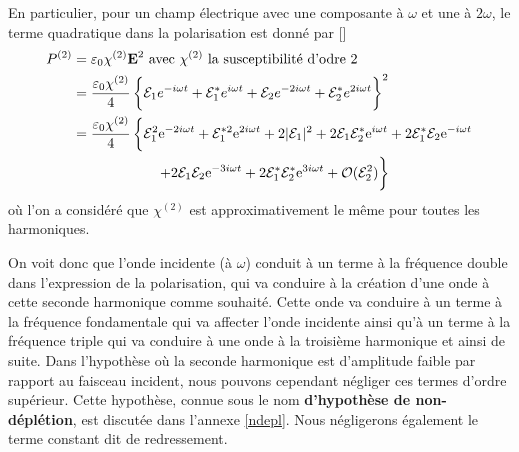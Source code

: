 \documentclass[11pt,a4paper]{article}
\newcommand{\ncite}[1]{[\citenum{#1}]}
\newcommand{\E}{\mathcal{E}}
\newcommand{\e}[1]{\text{e}^{#1}}
\renewcommand{\v}[1]{\boldsymbol{\mathbf{#1}}}
\begin{document}
En particulier, pour un champ électrique avec une composante à $\omega$ et une à $2\omega$, le terme quadratique dans la polarisation est donné par \ncite{joffre}
\begin{equation}
\label{eq:pola}
\begin{aligned}
	P^{(2)} &= \varepsilon_0 \chi^{(2)} \v E^2  \text{ avec $\chi^{(2)}$ la susceptibilité d'odre 2}\\
	&= \frac{\varepsilon_0 \chi^{(2)}}{4} \left\{\mathcal E_1 e^{-i\omega t} + \mathcal E_1^* e^{i\omega t} + \mathcal E_2 e^{-2i\omega t} + \mathcal E_2^* e^{2i\omega t} \vphantom{\frac12}\right\}^2 \\
	&= \frac{\varepsilon_0 \chi^{(2)}}{4} \left\{\mathcal E_1^2 \e{-2i\omega t} + \E_1^{*2} \e{2i\omega t} + 2|\mathcal E_1|^2 + 2 \E_1\E_2^* \e{i\omega t} + 2 \E_1^*\E_2 \e{-i\omega t} \vphantom{\frac12}\right. \\
	&\qquad\qquad\qquad \left. + 2 \E_1\E_2 \e{-3 i\omega t}  + 2 \E_1^*\E_2^* \e{3 i\omega t} + \mathcal O(\E_2^2) \vphantom{\frac12}\right\} \\ 
\end{aligned}
\end{equation}
où l'on a considéré que $\chi^{(2)}$ est approximativement le même pour toutes les harmoniques. 

On voit donc que l'onde incidente (à $\omega$) conduit à un terme à la fréquence double dans l'expression de la polarisation, qui va conduire à la création d'une onde à cette seconde harmonique comme souhaité. Cette onde va conduire à un terme à la fréquence fondamentale qui va affecter l'onde incidente ainsi qu'à un terme à la fréquence triple qui va conduire à une onde à la troisième harmonique et ainsi de suite. 
Dans l'hypothèse où la seconde harmonique est d'amplitude faible par rapport au faisceau incident, nous pouvons cependant négliger ces termes d'ordre supérieur. Cette hypothèse, connue sous le nom \textbf{d'hypothèse de non-déplétion}, est discutée dans l'annexe \ref{ndepl}. Nous négligerons également le terme constant dit de redressement. %


\end{document}
